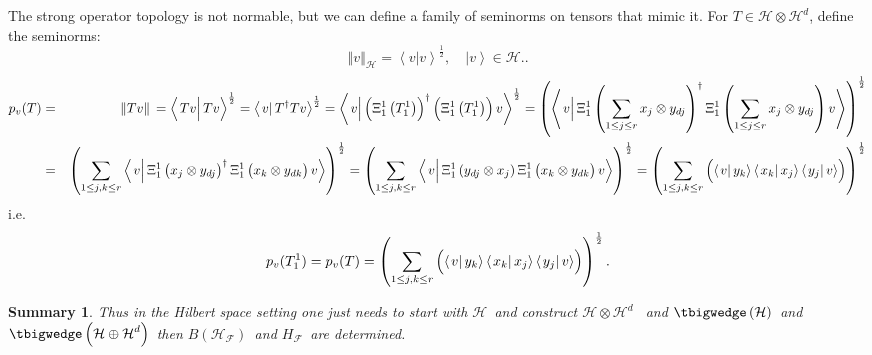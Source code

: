 \documentclass[aps,preprint]{revtex4}
\newtheorem{summary}[theorem]{Summary}
\begin{document}
The strong operator topology is not normable, but we can define a family of
seminorms on tensors that mimic it. For $T\in \mathcal{H}\otimes \mathcal{H}%
^{d}$, define the seminorms:%
\begin{equation}
\left\Vert v\right\Vert _{\mathcal{H}}=\left\langle \left. \overset{}{v}%
\right\vert v\right\rangle ^{\frac{1}{2}},\quad \left\vert v\right\rangle
\in \mathcal{H}..
\end{equation}
\begin{eqnarray*}
p_{v}(T) &=&\Vert Tv\Vert \,=\left\langle \left. \overset{}{Tv}\right\vert
Tv\right\rangle ^{\frac{1}{2}}=\left\langle \left. \overset{}{v}\right\vert
T^{\dagger }Tv\right\rangle ^{\frac{1}{2}}=\left\langle \left. \overset{%
\overset{}{}}{v}\right\vert \left( \overset{}{\Xi _{1}^{1}\left(
T_{1}^{1}\right) }\right) ^{\dagger }\left( \overset{}{\Xi _{1}^{1}\left(
T_{1}^{1}\right) }\right) v\right\rangle ^{\frac{1}{2}}=\left( \left\langle
\left. \overset{\overset{}{}}{v}\right\vert \Xi _{1}^{1}\left( \overset{}{%
\sum_{1\leq j\leq r}x_{j}\otimes y_{dj}}\right) ^{\dagger }\Xi
_{1}^{1}\left( \overset{}{\sum_{1\leq j\leq r}x_{j}\otimes y_{dj}}\right)
v\right\rangle \right) ^{\frac{1}{2}} \\
&=&\left( \sum_{1\leq j,k\leq r}\left\langle \left. \overset{\overset{}{}}{v}%
\right\vert \Xi _{1}^{1}\left( \overset{}{x_{j}\otimes y_{dj}}\right)
^{\dagger }\Xi _{1}^{1}\left( \overset{}{x_{k}\otimes y_{dk}}\right)
v\right\rangle \right) ^{\frac{1}{2}}=\left( \sum_{1\leq j,k\leq
r}\left\langle \left. \overset{\overset{}{}}{v}\right\vert \Xi
_{1}^{1}\left( y_{dj}\otimes x_{j}\right) \Xi _{1}^{1}\left( \overset{}{%
x_{k}\otimes y_{dk}}\right) v\right\rangle \right) ^{\frac{1}{2}}=\left(
\sum_{1\leq j,k\leq r}\left( \overset{}{\left\langle \left. v\right\vert
y_{k}\right\rangle \left\langle \left. x_{k}\right\vert x_{j}\right\rangle
\left\langle \left. y_{j}\right\vert v\right\rangle }\right) \right) ^{\frac{%
1}{2}}
\end{eqnarray*}%
i.e. 
\begin{equation}
p_{v}(T_{1}^{1})=p_{v}(T)=\left( \sum_{1\leq j,k\leq r}\left( \overset{}{%
\left\langle \left. v\right\vert y_{k}\right\rangle \left\langle \left.
x_{k}\right\vert x_{j}\right\rangle \left\langle \left. y_{j}\right\vert
v\right\rangle }\right) \right) ^{\frac{1}{2}}.
\end{equation}

\begin{summary}
{\large Thus in the Hilbert space setting one just needs to start with }$%
\mathcal{H}${\large \ and construct }$\mathcal{H}\otimes \mathcal{H}^{d}$%
{\large \ and }$\tbigwedge \left( \mathcal{H}\right) ${\large \ and }$%
\tbigwedge \left( \mathcal{H\oplus H}^{d}\right) ${\large \ then }$B\left( 
\mathcal{H}_{\mathcal{F}}\right) ${\large \ and }$H_{\mathcal{F}}${\large \
are determined.}
\end{summary}
\end{document}
